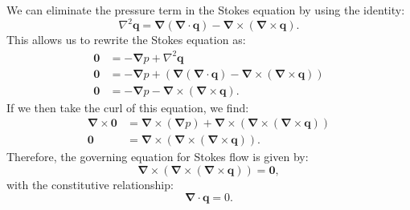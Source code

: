 \documentclass{article}
\theoremstyle{definition}
\begin{document}
\subsection{}
We can eliminate the pressure term in the Stokes equation by using the
identity:
\begin{equation*}
    \nabla^2 \symbf{q} = \symbf{\nabla} \left( \symbf{\nabla} \cdot \symbf{q} \right) - \symbf{\nabla} \times \left( \symbf{\nabla} \times \symbf{q} \right).
\end{equation*}
This allows us to rewrite the Stokes equation as:
\begin{align*}
    \symbf{0} & = -\symbf{\nabla} p + \nabla^2 \symbf{q}                                                                                                                                 \\
    \symbf{0} & = -\symbf{\nabla} p + \left( \symbf{\nabla} \left( \symbf{\nabla} \cdot \symbf{q} \right) - \symbf{\nabla} \times \left( \symbf{\nabla} \times \symbf{q} \right) \right) \\
    \symbf{0} & = -\symbf{\nabla} p - \symbf{\nabla} \times \left( \symbf{\nabla} \times \symbf{q} \right).
\end{align*}
If we then take the curl of this equation, we find:
\begin{align*}
    \symbf{\nabla} \times \symbf{0} & = \symbf{\nabla} \times \left( \symbf{\nabla} p \right) + \symbf{\nabla} \times \left( \symbf{\nabla} \times \left( \symbf{\nabla} \times \symbf{q} \right) \right) \\
    \symbf{0}                       & = \symbf{\nabla} \times \left( \symbf{\nabla} \times \left( \symbf{\nabla} \times \symbf{q} \right) \right).
\end{align*}
Therefore, the governing equation for Stokes flow is given by:
\begin{equation*}
    \symbf{\nabla} \times \left( \symbf{\nabla} \times \left( \symbf{\nabla} \times \symbf{q} \right) \right) = \symbf{0},
\end{equation*}
with the constitutive relationship:
\begin{equation*}
    \symbf{\nabla} \cdot \symbf{q} = 0.
\end{equation*}
\end{document}
